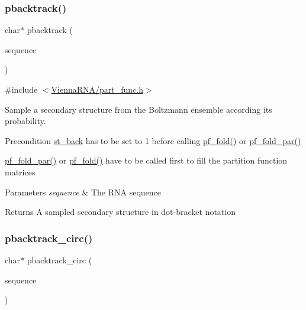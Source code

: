 \subsubsection{\texorpdfstring{pbacktrack()}{pbacktrack()}}
{\footnotesize\ttfamily char$\ast$ pbacktrack (\begin{DoxyParamCaption}\item[{char $\ast$}]{sequence }\end{DoxyParamCaption})}



{\ttfamily \#include $<$\mbox{\hyperlink{part__func_8h}{Vienna\+R\+N\+A/part\+\_\+func.\+h}}$>$}



Sample a secondary structure from the Boltzmann ensemble according its probability. 

\begin{DoxyPrecond}{Precondition}
\mbox{\hyperlink{group__subopt__stochbt_gacd79b1a570e6ad9be24cb11fe8cae30a}{st\+\_\+back}} has to be set to 1 before calling \mbox{\hyperlink{group__pf__fold_gadc3db3d98742427e7001a7fd36ef28c2}{pf\+\_\+fold()}} or \mbox{\hyperlink{group__pf__fold_gac4f95bee734b2563a3d6e9932117ebdf}{pf\+\_\+fold\+\_\+par()}} 

\mbox{\hyperlink{group__pf__fold_gac4f95bee734b2563a3d6e9932117ebdf}{pf\+\_\+fold\+\_\+par()}} or \mbox{\hyperlink{group__pf__fold_gadc3db3d98742427e7001a7fd36ef28c2}{pf\+\_\+fold()}} have to be called first to fill the partition function matrices
\end{DoxyPrecond}

\begin{DoxyParams}{Parameters}
{\em sequence} & The R\+NA sequence \\
\hline
\end{DoxyParams}
\begin{DoxyReturn}{Returns}
A sampled secondary structure in dot-\/bracket notation 
\end{DoxyReturn}
\mbox{\label{group__subopt__stochbt_ga00474051204ac9ad576b3e45174d03ff}} 
\subsubsection{\texorpdfstring{pbacktrack\+\_\+circ()}{pbacktrack\_circ()}}
{\footnotesize\ttfamily char$\ast$ pbacktrack\+\_\+circ (\begin{DoxyParamCaption}\item[{char $\ast$}]{sequence }\end{DoxyParamCaption})}



